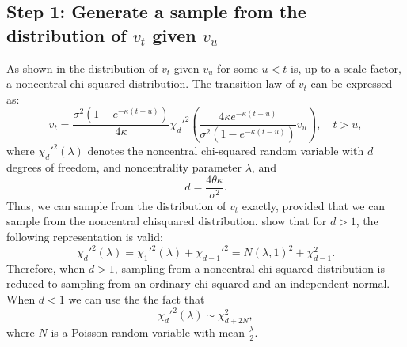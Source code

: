         \subsection*{Step 1: Generate a sample from the distribution of $v_t$ given $v_u$}
            As shown in \cite{CoxRoss1985} the distribution of $v_t$ given $v_u$ for some $u < t$ is, up to a scale factor, a noncentral chi-squared distribution. The transition law of $v_t$ can be expressed as:
            \begin{equation}
                v_t = \frac{\sigma^2(1-e^{-\kappa(t-u)})}{4\kappa}\chi_d'^{2}\left(\frac{4\kappa e^{-\kappa(t-u)}}{\sigma^2(1-e^{-\kappa(t-u)})} v_u  \right), \quad t > u, \label{BK:vol_law}
            \end{equation}
            where $\chi_d'^{2}(\lambda)$ denotes the noncentral chi-squared random
            variable with $d$ degrees of freedom, and noncentrality
            parameter $\lambda$, and
            \begin{equation}
                d = \frac{4\theta\kappa}{\sigma^2} \label{BK:vol_law:parameter}.
            \end{equation}
            Thus, we can sample from the distribution of $v_t$ exactly,
            provided that we can sample from the noncentral chisquared distribution.
            \cite{Johnson1994} show that for $d > 1$, the following representation is valid:
            \begin{equation}
                \chi_d'^{2}(\lambda) = \chi_1'^{2}(\lambda) + \chi_{d-1}'^{2} = N(\lambda, 1)^2 + \chi_{d-1}^{2}.
            \end{equation}
            Therefore, when $d > 1$, sampling from a noncentral chi-squared distribution
            is reduced to sampling from an ordinary chi-squared and an independent normal.
            When $d < 1$ we can use the the fact that
            \begin{equation}
                \chi_d'^{2}(\lambda) \sim \chi_{d + 2N}^{2},
            \end{equation}
            where $N$ is a Poisson random variable with mean $\frac{\lambda}{2}$.

